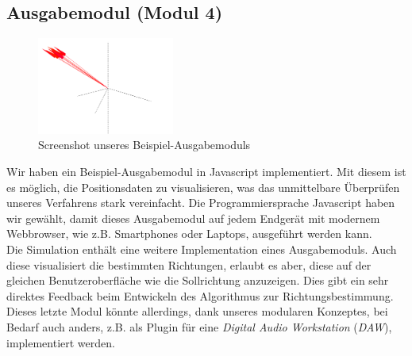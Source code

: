 \subsection{Ausgabemodul (Modul 4)}
\begin{figure}
	\centering
    \includegraphics[width=0.4\textwidth]{img/output}
    \caption{Screenshot unseres Beispiel-Ausgabemoduls\label{fig:output}}
\end{figure}
Wir haben ein Beispiel-Ausgabemodul in Javascript implementiert. Mit diesem ist es möglich, die Positionsdaten zu visualisieren, was das unmittelbare Überprüfen unseres Verfahrens stark vereinfacht. Die Programmiersprache Javascript haben wir gewählt, damit dieses Ausgabemodul auf jedem Endgerät mit modernem Webbrowser, wie z.B. Smartphones oder Laptops, ausgeführt werden kann.\\
Die Simulation enthält eine weitere Implementation eines Ausgabemoduls. Auch diese visualisiert die bestimmten Richtungen, erlaubt es aber, diese auf der gleichen Benutzeroberfläche wie die Sollrichtung anzuzeigen. Dies gibt ein sehr direktes Feedback beim Entwickeln des Algorithmus zur Richtungsbestimmung. Dieses letzte Modul könnte allerdings, dank unseres modularen Konzeptes, bei Bedarf auch anders, z.B. als Plugin für eine \textit{Digital Audio Workstation} (\textit{DAW}), implementiert werden.

